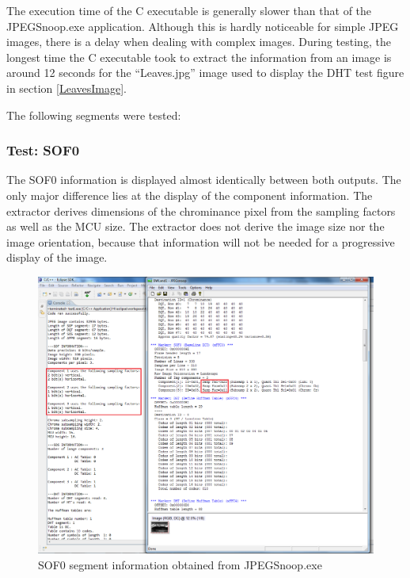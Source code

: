 The execution time of the C executable is generally
slower than that of the JPEGSnoop.exe 
application. Although this is hardly noticeable
for simple JPEG images, there is a delay
when dealing with complex images. During testing,
the longest time the C executable took to extract 
the information from an image is around 12 seconds
for the ``Leaves.jpg'' image used to display the
DHT test figure in section \ref{LeavesImage}.

The following segments were tested:

\subsubsection{Test: SOF0}

The SOF0 information is displayed almost
identically between both outputs. 
The only major difference lies at the display of
the component information. The extractor
derives dimensions of the chrominance pixel
from the sampling factors as well as the MCU size.
The extractor does not derive the image size nor the
image orientation, because that information will
not be needed for a progressive display of the image.

\begin{figure}[!hbtp]
\begin{center}
\includegraphics[scale=0.5]{figures/jpegSOFtest.png} 
\end{center}
\caption{SOF0 segment information obtained from JPEGSnoop.exe}
\end{figure}

